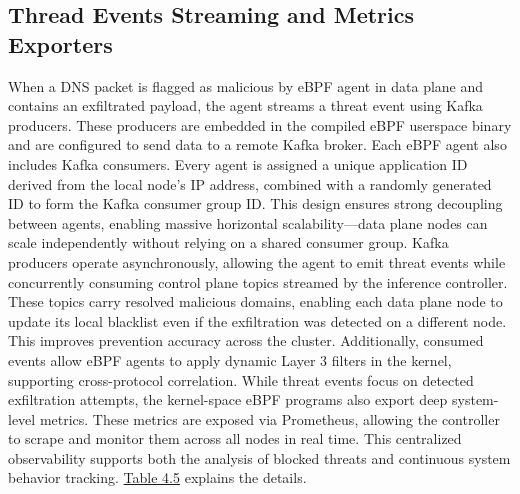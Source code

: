 \documentclass [11pt, proquest] {uwthesis}[2020/02/24]
\begin{document}
\subsection{Thread Events Streaming and Metrics Exporters}
\label{sec:threat-event-streaming}
When a DNS packet is flagged as malicious by eBPF agent in data plane and contains an exfiltrated payload, the agent streams a threat event using Kafka producers. These producers are embedded in the compiled eBPF userspace binary and are configured to send data to a remote Kafka broker. Each eBPF agent also includes Kafka consumers. Every agent is assigned a unique application ID derived from the local node’s IP address, combined with a randomly generated ID to form the Kafka consumer group ID. This design ensures strong decoupling between agents, enabling massive horizontal scalability—data plane nodes can scale independently without relying on a shared consumer group. Kafka producers operate asynchronously, allowing the agent to emit threat events while concurrently consuming control plane topics streamed by the inference controller. These topics carry resolved malicious domains, enabling each data plane node to update its local blacklist even if the exfiltration was detected on a different node. This improves prevention accuracy across the cluster. Additionally, consumed events allow eBPF agents to apply dynamic Layer 3 filters in the kernel, supporting cross-protocol correlation. While threat events focus on detected exfiltration attempts, the kernel-space eBPF programs also export deep system-level metrics. These metrics are exposed via Prometheus, allowing the controller to scrape and monitor them across all nodes in real time. This centralized observability supports both the analysis of blocked threats and continuous system behavior tracking. \hyperref[tab:kafka-topics]{Table 4.5} explains the details.
\end{document}
